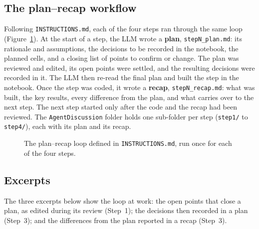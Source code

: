 \documentclass[11pt,a4paper]{article}
\begin{document}
\subsection{The plan–recap workflow}
Following \texttt{INSTRUCTIONS.md}, each of the four steps ran through the same loop (Figure~\ref{fig:loop}). At the start of a step, the LLM wrote a \textbf{plan}, \texttt{stepN\_plan.md}: its rationale and assumptions, the decisions to be recorded in the notebook, the planned cells, and a closing list of points to confirm or change. The plan was reviewed and edited, its open points were settled, and the resulting decisions were recorded in it. The LLM then re-read the final plan and built the step in the notebook. Once the step was coded, it wrote a \textbf{recap}, \texttt{stepN\_recap.md}: what was built, the key results, every difference from the plan, and what carries over to the next step. The next step started only after the code and the recap had been reviewed. The \texttt{AgentDiscussion} folder holds one sub-folder per step (\texttt{step1/} to \texttt{step4/}), each with its plan and its recap.

\begin{figure}[htbp]\centering
  \caption{The plan–recap loop defined in \texttt{INSTRUCTIONS.md}, run once for each of the four steps.}\label{fig:loop}
\end{figure}

\subsection{Excerpts}
The three excerpts below show the loop at work: the open points that close a plan, as edited during its review (Step~1); the decisions then recorded in a plan (Step~3); and the differences from the plan reported in a recap (Step~3).


\end{document}
